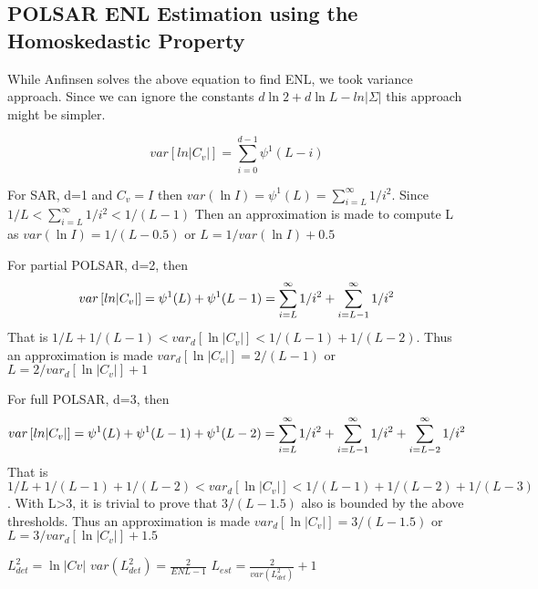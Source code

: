 \subsection{POLSAR ENL Estimation using the Homoskedastic Property}

While Anfinsen solves the above equation to find ENL,
  we took variance approach.
Since we can ignore the constants $d\ln2 + d\ln{L} -ln|\Sigma|$ this approach might be simpler.

\begin{equation}
  var \left[ ln|C_v| \right] = \sum^{d-1}_{i=0} \psi^1(L-i)
\end{equation}

For SAR, d=1 and $C_v=I$ then
$var(\ln{I}) = \psi^1(L)=\sum^{\infty}_{i=L}1/i^2$.
Since $1/L < \sum^{\infty}_{i=L}1/i^2 < 1/(L-1)$ Then an approximation is made to compute L as
$var(\ln{I}) = 1/(L-0.5)$ or $L=1/var(\ln{I}) + 0.5 $

For partial POLSAR, d=2, then
\begin{equation}
  var \left[ ln|C_v| \right] = \psi^1(L) + \psi^1(L-1) \\
    = \sum^{\infty}_{i=L}1/i^2 + \sum^{\infty}_{i=L-1}1/i^2 \\    
\end{equation}
That is $1/L + 1/(L-1) < var_d \left[ \ln |C_v| \right] < 1/(L-1) + 1/(L-2)$.
Thus an approximation is made $var_d \left[ \ln |C_v| \right] = 2/(L-1)$
or $L = 2/var_d \left[ \ln |C_v| \right] + 1$

For full POLSAR, d=3, then
\begin{equation}
  var \left[ ln|C_v| \right] = \psi^1(L) + \psi^1(L-1) + \psi^1(L-2) \\
    = \sum^{\infty}_{i=L}1/i^2 + \sum^{\infty}_{i=L-1}1/i^2  + \sum^{\infty}_{i=L-2}1/i^2 \\    
\end{equation}
That is $1/L + 1/(L-1) + 1/(L-2) < var_d \left[ \ln |C_v| \right] < 1/(L-1) + 1/(L-2) + 1/(L-3)$.
With L>3, it is trivial to prove that $3/(L-1.5)$ also is bounded by the above thresholds.
Thus an approximation is made $var_d \left[ \ln |C_v| \right] = 3/(L-1.5)$
or $L = 3/var_d \left[ \ln |C_v| \right] + 1.5$

$L_{det}^2 = \ln{|Cv|}$
$var(L_{det}^2)= \frac{2}{ENL-1}$
$L_{est}=\frac{2}{var(L_{det}^2)} + 1$

